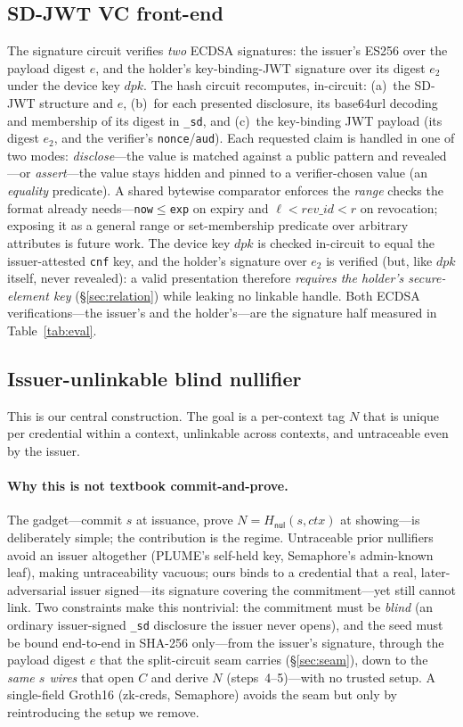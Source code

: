 \documentclass[11pt]{article}
\theoremstyle{plain}
\theoremstyle{definition}
\begin{document}
\subsection{SD-JWT VC front-end}\label{sec:frontend}
The signature circuit verifies \emph{two} ECDSA signatures: the issuer's ES256 over
the payload digest $e$, and the holder's key-binding-JWT signature over its digest
$e_2$ under the device key $\mathit{dpk}$. The hash circuit recomputes, in-circuit:
(a)~the SD-JWT structure and $e$, (b)~for each presented disclosure, its base64url
decoding and membership of its digest in \texttt{\_sd}, and (c)~the key-binding JWT
payload (its digest $e_2$, and the verifier's \texttt{nonce}/\texttt{aud}). Each
requested claim is handled in one of two modes: \emph{disclose}---the value is matched
against a public pattern and revealed---or \emph{assert}---the value stays hidden and
pinned to a verifier-chosen value (an \emph{equality} predicate). A shared bytewise
comparator enforces the \emph{range} checks the format already needs---\texttt{now}$\le$\texttt{exp}
on expiry and $\ell<\mathit{rev\_id}<r$ on revocation; exposing it as a general range or
set-membership predicate over arbitrary attributes is future work. The
device key $\mathit{dpk}$ is checked in-circuit to equal the issuer-attested
\texttt{cnf} key, and the holder's signature over $e_2$ is verified (but, like
$\mathit{dpk}$ itself, never revealed): a valid presentation therefore \emph{requires
the holder's secure-element key} (\S\ref{sec:relation}) while leaking no linkable
handle. Both ECDSA verifications---the issuer's and the holder's---are the signature
half measured in Table~\ref{tab:eval}.

\subsection{Issuer-unlinkable blind nullifier}\label{sec:blind}
This is our central construction. The goal is a per-context tag $N$ that is unique per
credential within a context, unlinkable across contexts, and untraceable even by the
issuer.

\paragraph{Why this is not textbook commit-and-prove.} The gadget---commit $s$ at
issuance, prove $N=H_{\mathsf{nul}}(s,\mathit{ctx})$ at showing---is deliberately
simple; the contribution is the regime. Untraceable prior nullifiers avoid an issuer
altogether (PLUME's self-held key, Semaphore's admin-known leaf), making untraceability
vacuous; ours binds to a credential that a real, later-adversarial issuer
signed---its signature covering the commitment---yet still cannot link. Two constraints
make this nontrivial: the commitment must be \emph{blind} (an ordinary issuer-signed
\texttt{\_sd} disclosure the issuer never opens), and the seed must be bound end-to-end
in SHA-256 only---from the issuer's signature, through the payload digest $e$ that the
split-circuit seam carries (\S\ref{sec:seam}), down to the \emph{same $s$ wires} that
open $C$ and derive $N$ (steps~4--5)---with no trusted setup. A single-field Groth16
(zk-creds, Semaphore) avoids the seam but only by reintroducing the setup we remove.
\end{document}

